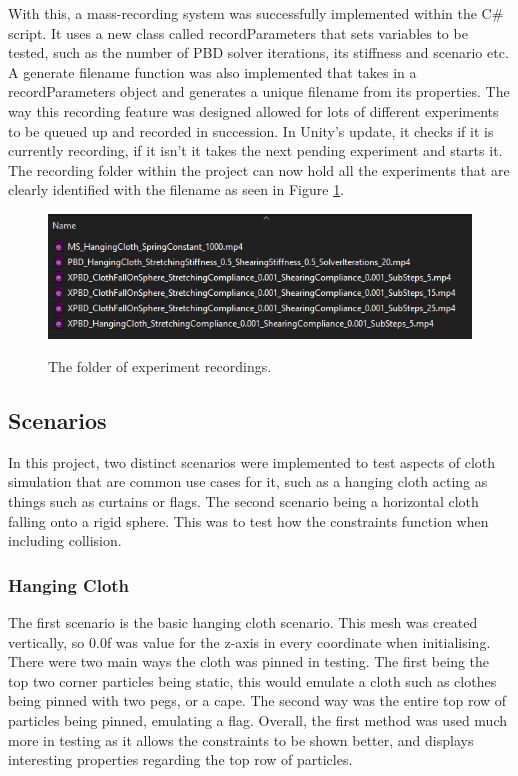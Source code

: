 \documentclass[12pt,a4paper]{article}
\begin{document}
With this, a mass-recording system was successfully implemented within the C\# script. It uses a new class called recordParameters that sets variables to be tested, such as the number of PBD solver iterations, its stiffness and scenario etc. A generate filename function was also implemented that takes in a recordParameters object and generates a unique filename from its properties. The way this recording feature was designed allowed for lots of different experiments to be queued up and recorded in succession. In Unity's update, it checks if it is currently recording, if it isn't it takes the next pending experiment and starts it. The recording folder within the project can now hold all the experiments that are clearly identified with the filename as seen in Figure \ref{fig:recs}.

\begin{figure}
	\centering
	\caption{The folder of experiment recordings.}
	\includegraphics[scale=0.8]{recs.png}
	\label{fig:recs}
\end{figure}


\subsection{Scenarios}
In this project, two distinct scenarios were implemented to test aspects of cloth simulation that are common use cases for it, such as a hanging cloth acting as things such as curtains or flags. The second scenario being a horizontal cloth falling onto a rigid sphere. This was to test how the constraints function when including collision. 
\subsubsection{Hanging Cloth}
The first scenario is the basic hanging cloth scenario. This mesh was created vertically, so 0.0f was value for the z-axis in every coordinate when initialising. There were two main ways the cloth was pinned in testing. The first being the top two corner particles being static, this would emulate a cloth such as clothes being pinned with two pegs, or a cape. The second way was the entire top row of particles being pinned, emulating a flag. Overall, the first method was used much more in testing as it allows the constraints to be shown better, and displays interesting properties regarding the top row of particles. \\
\end{document}

